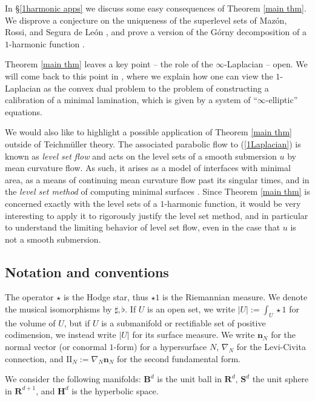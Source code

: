 \documentclass[reqno,11pt]{amsart}
\newcommand{\RR}{\mathbf{R}}
\newcommand{\Hyp}{\mathbf H}
\newcommand{\Sph}{\mathbf S}
\newcommand{\Ball}{\mathbf{B}}
\newcommand{\Two}{\mathrm{I\!I}}
\newcommand{\normal}{\mathbf n}
\newcommand{\dfn}[1]{\emph{#1}\index{#1}}
\theoremstyle{definition}
\numberwithin{equation}{section}
\begin{document}
In \S\ref{1harmonic apps} we discuss some easy consequences of Theorem \ref{main thm}.
We disprove a conjecture on the uniqueness of the superlevel sets of Maz\'on, Rossi, and Segura de Le\'on \cite[Remark 2.8]{Mazon14}, and prove a version of the G\'orny decomposition of a $1$-harmonic function \cite[Theorem 1.2]{górny2017planar}.

Theorem \ref{main thm} leaves a key point -- the role of the $\infty$-Laplacian -- open.
We will come back to this point in \cite{BackusInfinityMaxwell1}, where we explain how one can view the $1$-Laplacian as the convex dual problem to the problem of constructing a calibration of a minimal lamination, which is given by a system of ``$\infty$-elliptic'' equations.

We would also like to highlight a possible application of Theorem \ref{main thm} outside of Teichm\"uller theory.
The associated parabolic flow to (\ref{1Laplacian}) is known as \dfn{level set flow} and acts on the level sets of a smooth submersion $u$ by mean curvature flow.
As such, it arises as a model of interfaces with minimal area, as a means of continuing mean curvature flow past its singular times, and in the \dfn{level set method} of computing minimal surfaces \cite{Evans91,Sethian90,Chen89,Thomas05}.
Since Theorem \ref{main thm} is concerned exactly with the level sets of a $1$-harmonic function, it would be very interesting to apply it to rigorously justify the level set method, and in particular to understand the limiting behavior of level set flow, even in the case that $u$ is not a smooth submersion.

\subsection{Notation and conventions}
The operator $\star$ is the Hodge star, thus $\star 1$ is the Riemannian measure.
We denote the musical isomorphisms by $\sharp, \flat$.
If $U$ is an open set, we write $|U| := \int_U \star 1$ for the volume of $U$, but if $U$ is a submanifold or rectifiable set of positive codimension, we instead write $|U|$ for its surface measure.
We write $\normal_N$ for the normal vector (or conormal $1$-form) for a hypersurface $N$, $\nabla_N$ for the Levi-Civita connection, and $\Two_N := \nabla_N \normal_N$ for the second fundamental form.

We consider the following manifolds: $\Ball^d$ is the unit ball in $\RR^d$, $\Sph^d$ the unit sphere in $\RR^{d + 1}$, and $\Hyp^d$ is the hyperbolic space.
\end{document}
